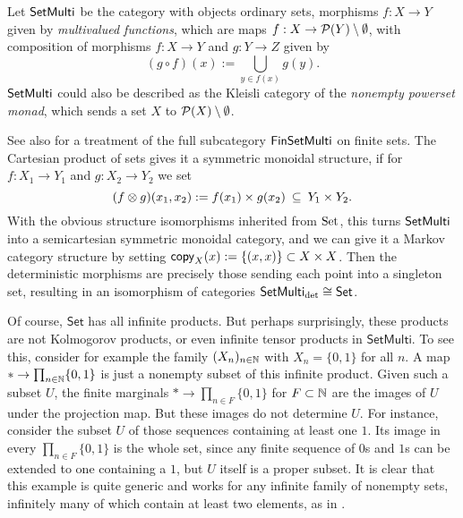 \documentclass[11pt]{article}
\renewcommand{\sf}{\mathsf}
\begin{document}
\begin{example}
    \label{setmulti}
    Let $\operatorname{\mathsf{SetMulti}}$ be the category with objects ordinary sets, morphisms $f: X \to Y$ given by \emph{multivalued functions}, which are maps $f: X \to \mathcal{P}(Y)\setminus \emptyset$, with composition of morphisms $f : X \to Y$ and $g : Y \to Z$ given by
    	\begin{equation}
		\label{relational_composition}
		(g\circ f)(x) := \bigcup_{y \in f(x)} g(y).
      \end{equation}
    $\operatorname{\mathsf{SetMulti}}$ could also be described as the Kleisli category of the
    \emph{nonempty powerset monad}, which sends a set $X$ to $\mathcal{P}(X) \setminus \emptyset$.

    See also \cite[Example~2.6]{markov_cats} for a treatment of the full subcategory $\operatorname{\mathsf{FinSetMulti}}$ on finite sets.
    The Cartesian product of sets gives it a symmetric monoidal structure, if for $f : X_1 \to Y_1$ and $g: X_2 \to Y_2$ we set
	\[
	(f \otimes g)(x_1,x_2) := f(x_1) \times g(x_2) \:\subseteq\: Y_1 \times Y_2.
	\]
	With the obvious structure isomorphisms inherited from $\operatorname{Set}$, this turns $\operatorname{\mathsf{SetMulti}}$ into a semicartesian symmetric monoidal category, and we can give it a Markov category structure by setting
    $\mathsf{copy}_{X}(x) := \{(x,x)\} \subset X \times X$.
    Then the deterministic morphisms are precisely those sending each point into a singleton set, resulting in an isomorphism of categories
    $\SetMulti_\detc \cong \sf{Set}$.

    Of course, $\sf{Set}$ has all infinite products. But perhaps surprisingly, these products are not Kolmogorov products, or even infinite tensor products in $\sf{SetMulti}$.
    To see this, consider for example the family $(X_n)_{n\in\mathbb{N}}$ with $X_n = \{0,1\}$ for all $n$. 
    A map $* \to \prod_{n\in \mathbb{N}} \{0,1\}$ is just a nonempty subset of this infinite product.
    Given such a subset $U$, the finite marginals $* \to \prod_{n \in F} \{0,1\}$ for $F \subset \mathbb{N}$ are the images of $U$ under the projection map.
    But these images do not determine $U$. For instance, consider the subset $U$ of those sequences containing at least one $1$.
    Its image in every $\prod_{n \in F} \{0,1\}$ is the whole set, since any finite sequence of $0$s and $1$s can be extended to one containing a $1$, but $U$ itself is a proper subset. It is clear that this example is quite generic and works for any infinite family of nonempty sets, infinitely many of which contain at least two elements, as in .

\end{example}
\end{document}
